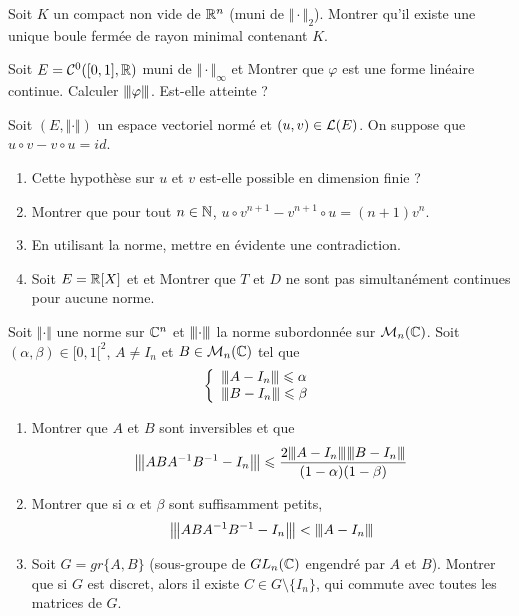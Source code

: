 \begin{exercise}
	Soit $K$ un compact non vide de $\mathbb{R}^{n}$ (muni de $\Vert\cdot\Vert_{2}$). Montrer qu'il existe une unique boule fermée de rayon minimal contenant $K$.
\end{exercise}

\begin{exercise}
	Soit $E=\mathcal{C}^{0}([0,1],\mathbb{R})$ muni de $\Vert\cdot\Vert_{\infty}$ et 
	Montrer que $\varphi$ est une forme linéaire continue. Calculer ${\left\vert\kern-0.25ex\left\vert\kern-0.25ex\left\vert{}\varphi \right\vert\kern-0.25ex\right\vert\kern-0.25ex\right\vert}$. Est-elle atteinte ?
\end{exercise}

\begin{exercise}
	Soit $(E,\Vert\cdot\Vert)$ un espace vectoriel normé et $(u,v)\in\mathcal{L}(E)$. On suppose que $u\circ v-v\circ u=id$.
	\begin{enumerate}
		\item Cette hypothèse sur $u$ et $v$ est-elle possible en dimension finie ?
		\item Montrer que pour tout $n\in\mathbb{N}$, $u\circ v^{n+1}-v^{n+1}\circ u=(n+1)v^{n}$.
		\item En utilisant la norme, mettre en évidente une contradiction.
		\item Soit $E=\mathbb{R}[X]$ et  et 
		Montrer que $T$ et $D$ ne sont pas simultanément continues pour aucune norme.
	\end{enumerate}
\end{exercise}

\begin{exercise}
	Soit $\Vert\cdot\Vert$ une norme sur $\mathbb{C}^{n}$ et ${\left\vert\kern-0.25ex\left\vert\kern-0.25ex\left\vert{}\cdot \right\vert\kern-0.25ex\right\vert\kern-0.25ex\right\vert}$ la norme subordonnée sur $\mathcal{M}_{n}(\mathbb{C})$. Soit $(\alpha,\beta)\in[0,1[^{2}$, $A\neq I_{n}$ et $B\in\mathcal{M}_{n}(\mathbb{C})$ tel que
	$$
	\left\{
		\begin{array}[]{l}
			\vertiii{A-I_{n}}\leqslant\alpha\\
			\vertiii{B-I_{n}}\leqslant\beta
		\end{array}
	\right.
	$$
	\begin{enumerate}
		\item Montrer que $A$ et $B$ sont inversibles et que 
		$${\left\vert\kern-0.25ex\left\vert\kern-0.25ex\left\vert{}ABA^{-1}B^{-1}-I_{n} \right\vert\kern-0.25ex\right\vert\kern-0.25ex\right\vert}\leqslant\frac{2{\left\vert\kern-0.25ex\left\vert\kern-0.25ex\left\vert{}A-I_{n} \right\vert\kern-0.25ex\right\vert\kern-0.25ex\right\vert}{\left\vert\kern-0.25ex\left\vert\kern-0.25ex\left\vert{}B-I_{n} \right\vert\kern-0.25ex\right\vert\kern-0.25ex\right\vert}}{(1-\alpha)(1-\beta)}$$
		\item Montrer que si $\alpha$ et $\beta$ sont suffisamment petits, 
		$${\left\vert\kern-0.25ex\left\vert\kern-0.25ex\left\vert{}ABA^{-1}B^{-1}-I_{n} \right\vert\kern-0.25ex\right\vert\kern-0.25ex\right\vert}<{\left\vert\kern-0.25ex\left\vert\kern-0.25ex\left\vert{}A-I_{n} \right\vert\kern-0.25ex\right\vert\kern-0.25ex\right\vert}$$
		\item Soit $G=gr\{A,B\}$ (sous-groupe de $GL_{n}(\mathbb{C})$ engendré par $A$ et $B$). Montrer que si $G$ est discret, alors il existe $C\in G\setminus\{I_{n}\}$, qui commute avec toutes les matrices de $G$.
	\end{enumerate}
\end{exercise}

